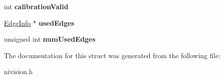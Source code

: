 \begin{DoxyCompactItemize}
\item 
\hypertarget{structStraightEdge__struct_a7531b81c0b37929cf8b9e0f99c3a28bc}{int {\bfseries calibration\-Valid}}\label{structStraightEdge__struct_a7531b81c0b37929cf8b9e0f99c3a28bc}

\item 
\hypertarget{structStraightEdge__struct_a1ffc78d28662a92aad0c5c8bbd6996fa}{\hyperlink{structEdgeInfo__struct}{\-Edge\-Info} $\ast$ {\bfseries used\-Edges}}\label{structStraightEdge__struct_a1ffc78d28662a92aad0c5c8bbd6996fa}

\item 
\hypertarget{structStraightEdge__struct_af19132c48caeac131001b7df209ec8e4}{unsigned int {\bfseries num\-Used\-Edges}}\label{structStraightEdge__struct_af19132c48caeac131001b7df209ec8e4}

\end{DoxyCompactItemize}


\-The documentation for this struct was generated from the following file\-:\begin{DoxyCompactItemize}
\item 
nivision.\-h\end{DoxyCompactItemize}
